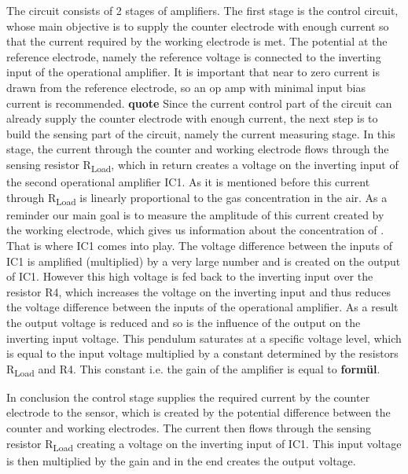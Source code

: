 The circuit consists of 2 stages of amplifiers. The first stage is the control circuit, whose main objective is to supply the counter electrode with enough current so that the current required by the working electrode is met. The potential at the reference electrode, namely the reference voltage is connected to the inverting input of the operational amplifier. It is important that near to zero current is drawn from the reference electrode, so an op amp with minimal input bias current is recommended. \textbf{quote}
Since the current control part of the circuit can already supply the counter electrode with enough current, the next step is to build the sensing part of the circuit, namely the current measuring stage. In this stage, the current through the counter and working electrode flows through the sensing resistor R\textsubscript{Load}, which in return creates a voltage on the inverting input of the second operational amplifier IC1. As it is mentioned before this current through R\textsubscript{Load} is linearly proportional to the gas concentration in the air. As a reminder our main goal is to measure the amplitude of this current created by the working electrode, which gives us information about the concentration of . That is where IC1 comes into play. The voltage difference between the inputs of IC1 is amplified (multiplied) by a very large number and is created on the output of IC1. However this high voltage is fed back to the inverting input over the resistor R4, which increases the voltage on the inverting input and thus reduces the voltage difference between the inputs of the operational amplifier. As a result the output voltage is reduced and so is the influence of the output on the inverting input voltage. This pendulum saturates at a specific voltage level, which is equal to the input voltage multiplied by a constant determined by the resistors R\textsubscript{Load} and R4. This constant i.e. the gain of the amplifier is equal to \textbf{formül}. \par
In conclusion the control stage supplies the required current by the counter electrode to the sensor, which is created by the potential difference between the counter and working electrodes. The current then flows through the sensing resistor  R\textsubscript{Load} creating a voltage on the inverting input of IC1. This input voltage is then multiplied by the gain and in the end creates the output voltage.

